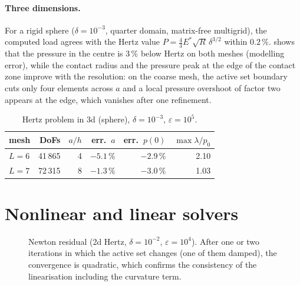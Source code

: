 \documentclass[11pt,a4paper]{article}
\begin{document}
\paragraph{Three dimensions.}
For a rigid sphere ($\delta=10^{-3}$, quarter domain, matrix-free multigrid), the computed load
agrees with the Hertz value $P=\tfrac43 E^*\sqrt{R}\,\delta^{3/2}$ within $0.2\,\%$.
 shows that the pressure in the centre is $3\,\%$ below Hertz on both meshes
(modelling error), while the contact radius and the pressure peak at the edge of the contact zone
improve with the resolution: on the coarse mesh, the active set boundary cuts only four elements
across $a$ and a local pressure overshoot of factor two appears at the edge, which vanishes after
one refinement.

\begin{table}[ht]
  \centering
  \begin{tabular}{lrrrrr}
    \toprule
    mesh & DoFs & $a/h$ & err.\ $a$ & err.\ $p(0)$ & $\max\lambda / p_0$ \\
    \midrule
    $L=6$ & 41\,865 & 4 & $-5.1\,\%$ & $-2.9\,\%$ & 2.10 \\
    $L=7$ & 72\,315 & 8 & $-1.3\,\%$ & $-3.0\,\%$ & 1.03 \\
    \bottomrule
  \end{tabular}
  \caption{Hertz problem in 3d (sphere), $\delta = 10^{-3}$, $\varepsilon = 10^5$.}
  \label{tab:hertz3d}
\end{table}

\section{Nonlinear and linear solvers}

\begin{figure}[ht]
  \centering
  \caption{Newton residual (2d Hertz, $\delta=10^{-2}$, $\varepsilon=10^4$). After one or two
  iterations in which the active set changes (one of them damped), the convergence is quadratic,
  which confirms the consistency of the linearisation including the curvature term.}
  \label{fig:newton}
\end{figure}
\end{document}
